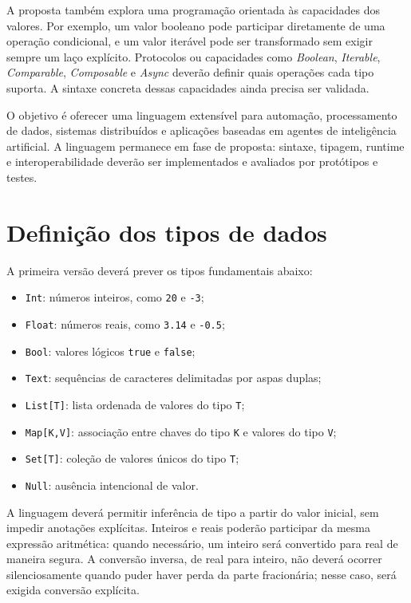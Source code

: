\documentclass[12pt,a4paper]{article}
\begin{document}
A proposta também explora uma programação orientada às capacidades dos valores. Por exemplo, um valor booleano pode participar diretamente de uma operação condicional, e um valor iterável pode ser transformado sem exigir sempre um laço explícito. Protocolos ou capacidades como \textit{Boolean}, \textit{Iterable}, \textit{Comparable}, \textit{Composable} e \textit{Async} deverão definir quais operações cada tipo suporta. A sintaxe concreta dessas capacidades ainda precisa ser validada.

O objetivo é oferecer uma linguagem extensível para automação, processamento de dados, sistemas distribuídos e aplicações baseadas em agentes de inteligência artificial. A linguagem permanece em fase de proposta: sintaxe, tipagem, runtime e interoperabilidade deverão ser implementados e avaliados por protótipos e testes.

\section{Definição dos tipos de dados}
A primeira versão deverá prever os tipos fundamentais abaixo:
\begin{itemize}
\item \texttt{Int}: números inteiros, como \texttt{20} e \texttt{-3};
\item \texttt{Float}: números reais, como \texttt{3.14} e \texttt{-0.5};
\item \texttt{Bool}: valores lógicos \texttt{true} e \texttt{false};
\item \texttt{Text}: sequências de caracteres delimitadas por aspas duplas;
\item \texttt{List[T]}: lista ordenada de valores do tipo \texttt{T};
\item \texttt{Map[K,V]}: associação entre chaves do tipo \texttt{K} e valores do tipo \texttt{V};
\item \texttt{Set[T]}: coleção de valores únicos do tipo \texttt{T};
\item \texttt{Null}: ausência intencional de valor.
\end{itemize}

A linguagem deverá permitir inferência de tipo a partir do valor inicial, sem impedir anotações explícitas. Inteiros e reais poderão participar da mesma expressão aritmética: quando necessário, um inteiro será convertido para real de maneira segura. A conversão inversa, de real para inteiro, não deverá ocorrer silenciosamente quando puder haver perda da parte fracionária; nesse caso, será exigida conversão explícita.
\end{document}
